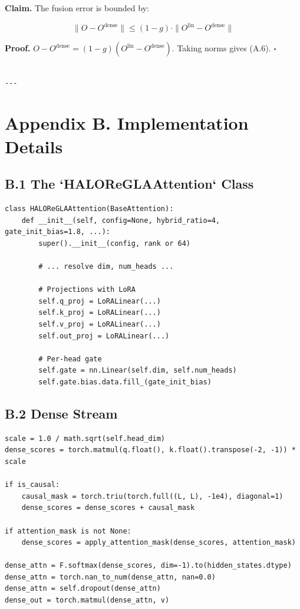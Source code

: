 \textbf{Claim.} The fusion error is bounded by:

\[
\|O - O^\text{dense}\| \leq (1 - g) \cdot \|O^\text{lin} - O^\text{dense}\|
\]

\textbf{Proof.} $O - O^\text{dense} = (1 - g)(O^\text{lin} - O^\text{dense})$. 
Taking norms gives (A.6). $\square$
\begin{lstlisting}

---
\end{lstlisting}


\section{Appendix B. Implementation Details}

\subsection{B.1 The `HALOReGLAAttention` Class}

\begin{lstlisting}
class HALOReGLAAttention(BaseAttention):
    def __init__(self, config=None, hybrid_ratio=4, gate_init_bias=1.8, ...):
        super().__init__(config, rank or 64)
        
        # ... resolve dim, num_heads ...
        
        # Projections with LoRA
        self.q_proj = LoRALinear(...)
        self.k_proj = LoRALinear(...)
        self.v_proj = LoRALinear(...)
        self.out_proj = LoRALinear(...)
        
        # Per-head gate
        self.gate = nn.Linear(self.dim, self.num_heads)
        self.gate.bias.data.fill_(gate_init_bias)
\end{lstlisting}

\subsection{B.2 Dense Stream}

\begin{lstlisting}
scale = 1.0 / math.sqrt(self.head_dim)
dense_scores = torch.matmul(q.float(), k.float().transpose(-2, -1)) * scale

if is_causal:
    causal_mask = torch.triu(torch.full((L, L), -1e4), diagonal=1)
    dense_scores = dense_scores + causal_mask

if attention_mask is not None:
    dense_scores = apply_attention_mask(dense_scores, attention_mask)

dense_attn = F.softmax(dense_scores, dim=-1).to(hidden_states.dtype)
dense_attn = torch.nan_to_num(dense_attn, nan=0.0)
dense_attn = self.dropout(dense_attn)
dense_out = torch.matmul(dense_attn, v)
\end{lstlisting}

